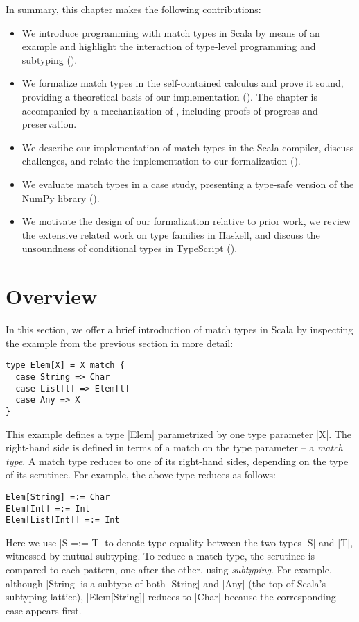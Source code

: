 In summary, this chapter makes the following contributions:
%
\begin{itemize}
  \item We introduce programming with match types in Scala by means of an example and highlight the interaction of type-level programming and subtyping ().

  \item We formalize match types in the self-contained calculus \SystemFm and prove it sound, providing a theoretical basis of our implementation (). The chapter is accompanied by a mechanization of \SystemFm, including proofs of progress and preservation.

  \item We describe our implementation of match types in the Scala compiler, discuss challenges, and relate the implementation to our formalization ().

  \item We evaluate match types in a case study, presenting a type-safe version of the NumPy library ().

  \item We motivate the design of our formalization relative to prior work, we review the extensive related work on type families in Haskell, and discuss the unsoundness of conditional types in TypeScript ().
\end{itemize}

\section{Overview}
\label{sec:overview}

In this section, we offer a brief introduction of match types in Scala by inspecting the example from the previous section in more detail:
%
\begin{lstlisting}
type Elem[X] = X match {
  case String => Char
  case List[t] => Elem[t]
  case Any => X
}
\end{lstlisting}
%
This example defines a type |Elem| parametrized by one type parameter |X|. The right-hand side is defined in terms of a match on the type parameter -- a \emph{match type}.
A match type reduces to one of its right-hand sides, depending on the type of its scrutinee.
For example, the above type reduces as follows:
%
\begin{lstlisting}
Elem[String] =:= Char
Elem[Int] =:= Int
Elem[List[Int]] =:= Int
\end{lstlisting}
%
Here we use |S =:= T| to denote type equality between the two types |S| and |T|, witnessed by mutual subtyping.
To reduce a match type, the scrutinee is compared to each pattern, one after the other, using \emph{subtyping}.
For example, although |String| is a subtype of both |String| and |Any| (the top of Scala's subtyping lattice), |Elem[String]| reduces to |Char| because the corresponding case appears first.

